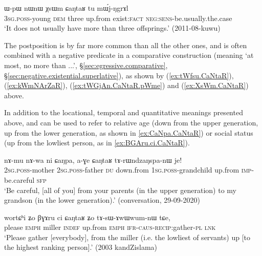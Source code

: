 \begin{exe}
\ex \label{ex:XsWm.CaNtaR}
 \gll ɯ-pɯ nɯnɯ χsɯm ɕaŋtaʁ tu mɯ́j-ŋgrɤl\\
\textsc{3sg}.\textsc{poss}-young \textsc{dem} three up.from exist:\textsc{fact} \textsc{neg}:\textsc{sens}-be.usually.the.case\\
\glt `It does not usually have more than three offsprings.' (2011-08-kuwu)
\end{exe}

The postposition  is by far more common than all the other ones, and is often combined with a negative predicate in a comparative construction (meaning `at most, no more than ...', §\ref{sec:egressive.comparative}, §\ref{sec:negative.existential.superlative}), as shown by (\ref{ex:tWfsu.CaNtaR}), (\ref{ex:kWmNArZaR}), (\ref{ex:tWGjAn.CaNtaR.pWme}) and (\ref{ex:XsWm.CaNtaR}) above. 


In addition to the locational, temporal and quantitative meanings presented above,  and   can be used to refer to relative age (down from the upper generation, up from the lower generation, as shown in \ref{ex:CaNpa.CaNtaR}) or social status (up from the lowliest person, as in \ref{ex:BGAru.ci.CaNtaR}).

 \begin{exe}
	\ex \label{ex:CaNpa.CaNtaR}
	\gll nɤ-mu nɤ-wa ni ɕaŋpa, a-ɣe ɕaŋtaʁ tɤ-rɯndzaŋspa-nɯ je! \\
	\textsc{2sg}.\textsc{poss}-mother 	\textsc{2sg}.\textsc{poss}-father \textsc{du} down.from \textsc{1sg}.\textsc{poss}-grandchild up.from \textsc{imp}-be.careful \textsc{sfp} \\
	\glt `Be careful, [all of you] from your parents (in the upper generation) to my grandson (in the lower generation).' (conversation, 29-09-2020)
\end{exe}

 \begin{exe}
	\ex \label{ex:BGAru.ci.CaNtaR}
	\gll  wortɕʰi ʑo βɣɤru ci ɕaŋtaʁ ʑo tɤ-sɯ-ɤwɯwum-nɯ tɕe, \\
	please \textsc{emph} miller \textsc{indef} up.from \textsc{emph} \textsc{ifr}-\textsc{caus}-\textsc{recip}:gather-\textsc{pl} \textsc{lnk} \\
	\glt `Please gather [everybody], from the miller (i.e. the lowliest of servants) up [to the highest ranking person].' (2003 kandZislama)
\end{exe}

